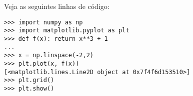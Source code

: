 \begin{ex}
  Veja as seguintes linhas de código:
\begin{verbatim}
>>> import numpy as np
>>> import matplotlib.pyplot as plt
>>> def f(x): return x**3 + 1
...
>>> x = np.linspace(-2,2)
>>> plt.plot(x, f(x))
[<matplotlib.lines.Line2D object at 0x7f4f6d153510>]
>>> plt.grid()
>>> plt.show()
\end{verbatim}
\end{ex}
